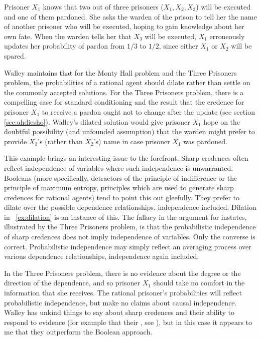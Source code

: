 \documentclass[phd,12pt,oneside]{ubcthesis}
\begin{document}
\begin{quotex}
  \label{ex:threepris} Prisoner $X_{1}$
  knows that two out of three prisoners ($X_{1},X_{2},X_{3}$) will be
  executed and one of them pardoned. She asks the warden of the prison
  to tell her the name of another prisoner who will be executed,
  hoping to gain knowledge about her own fate. When the warden tells
  her that $X_{3}$ will be executed, $X_{1}$ erroneously updates her
  probability of pardon from $1/3$ to $1/2$, since either $X_{1}$ or
  $X_{2}$ will be spared.\label{page:iabeiwet}
\end{quotex}

Walley maintains that for the Monty Hall problem and the Three
Prisoners problem, the probabilities of a rational agent should dilate
rather than settle on the commonly accepted solutions. For the Three
Prisoners problem, there is a compelling case for standard
conditioning and the result that the credence for prisoner $X_{1}$ to
receive a pardon ought not to change after the update (see section
\ref{sec:ahdiesho}). Walley's dilated solution would give prisoner
$X_{1}$ hope on the doubtful possibility (and unfounded assumption)
that the warden might prefer to provide $X_{3}$'s (rather than
$X_{2}$'s) name in case prisoner $X_{1}$ was pardoned.

This example brings an interesting issue to the forefront. Sharp
credences often reflect independence of variables where such
independence is unwarranted. Booleans (more specifically, detractors
of the principle of indifference or the principle of maximum entropy,
principles which are used to generate sharp credences for rational
agents) tend to point this out gleefully. They prefer to dilate over
the possible dependence relationships, independence included. Dilation
in {\xample}~\ref{ex:dilation} is an instance of this. The fallacy in
the argument for instates, illustrated by the Three Prisoners problem,
is that the probabilistic independence of sharp credences does not
imply independence of variables. Only the converse is correct.
Probabilistic independence may simply reflect an averaging process
over various dependence relationships, independence again included.

In the Three Prisoners problem, there is no evidence about the degree
or the direction of the dependence, and so prisoner $X_{1}$ should
take no comfort in the information that she receives. The rational
prisoner's probabilities will reflect probabilistic independence, but
make no claims about causal independence. Walley has unkind things to
say about sharp credences and their ability to respond to evidence
(for example that their ,
see ), but in this case it appears to me that
they outperform the Boolean approach.
\end{document}
